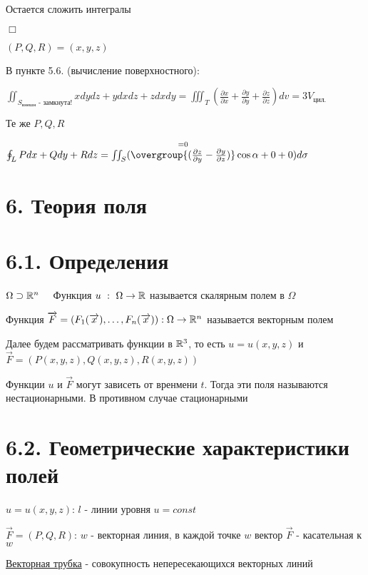 \documentclass[12pt]{article}
\begin{document}
    Остается сложить интегралы

    $\Box$

     $(P, Q, R) = (x, y, z)$

    В \Exs пункте 5.6. (вычисление поверхностного):

    $\iint_{S_{\text{внешн}} \text{ - замкнута!}} xdydz + ydxdz + zdxdy = \iiint_T (\frac{\partial x}{\partial x} + \frac{\partial y}{\partial y} + \frac{\partial z}{\partial z}) dv = 3V_{\text{цил.}}$

     Те же $P, Q, R$

    $\oint_L Pdx + Qdy + Rdz = \iint_{S} (\overset{= 0}{\overgroup{(\frac{\partial z}{\partial y} - \frac{\partial y}{\partial z})}} \cos\alpha + 0 + 0) d\sigma$

    \clearpage


    \section{6. Теория поля}


    \section{6.1. Определения}

     $\Omega \supset \mathbb{R}^n \quad$ Функция $u \ : \ \Omega \to \mathbb{R}$ называется скалярным полем в $\Omega$

     Функция $\overrightarrow{F} = (F_1(\overrightarrow{x}), \dots, F_n(\overrightarrow{x})) : \Omega \to \mathbb{R}^n$ называется векторным полем

    \Nota Далее будем рассматривать функции в $\mathbb{R}^3$, то есть $u = u(x, y, z)$ и $\overrightarrow{F} = (P(x, y, z), Q(x, y, z), R(x, y, z))$

    \Nota Функции $u$ и $\overrightarrow{F}$ могут зависеть от вренмени $t$. Тогда эти поля называются нестационарными. В противном случае стационарными


    \section{6.2. Геометрические характеристики полей}

    $u = u(x, y, z)$: $l$ - линии уровня $u = const$

    $\overrightarrow{F} = (P, Q, R)$: $w$ - векторная линия, в каждой точке $w$ вектор $\overrightarrow{F}$ - касательная к $w$

    \underline{Векторная трубка} - совокупность непересекающихся векторных линий
\end{document}
